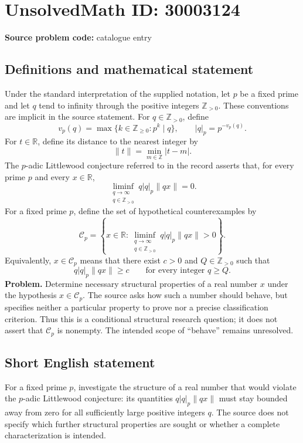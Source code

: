\documentclass[11pt]{article}
\newcommand{\Z}{\mathbb{Z}}
\newcommand{\R}{\mathbb{R}}
\begin{document}
\section*{UnsolvedMath ID: 30003124}
\textbf{Source problem code:} catalogue entry
\subsection{Definitions and mathematical statement}
Under the standard interpretation of the supplied notation, let \(p\) be a fixed prime and let \(q\) tend to infinity through the positive integers \(\Z_{>0}\). These conventions are implicit in the source statement. For \(q\in\Z_{>0}\), define
\[
v_p(q)=\max\{k\in\Z_{\geq 0}:p^k\mid q\},\qquad |q|_p=p^{-v_p(q)}.
\]
For \(t\in\R\), define its distance to the nearest integer by
\[
\|t\|=\min_{m\in\Z}|t-m|.
\]
The \(p\)-adic Littlewood conjecture referred to in the record asserts that, for every prime \(p\) and every \(x\in\R\),
\[
\liminf_{\substack{q\to\infty\\q\in\Z_{>0}}}q|q|_p\|qx\|=0.
\]
For a fixed prime \(p\), define the set of hypothetical counterexamples by
\[
\mathcal C_p=\left\{x\in\R:
\liminf_{\substack{q\to\infty\\q\in\Z_{>0}}}q|q|_p\|qx\|>0\right\}.
\]
Equivalently, \(x\in\mathcal C_p\) means that there exist \(c>0\) and \(Q\in\Z_{>0}\) such that
\[
q|q|_p\|qx\|\geq c\qquad\text{for every integer }q\geq Q.
\]
\textbf{Problem.} Determine necessary structural properties of a real number \(x\) under the hypothesis \(x\in\mathcal C_p\). The source asks how such a number should behave, but specifies neither a particular property to prove nor a precise classification criterion. Thus this is a conditional structural research question; it does not assert that \(\mathcal C_p\) is nonempty. The intended scope of ``behave'' remains unresolved.
\subsection{Short English statement}
For a fixed prime \(p\), investigate the structure of a real number that would violate the \(p\)-adic Littlewood conjecture: its quantities \(q|q|_p\|qx\|\) must stay bounded away from zero for all sufficiently large positive integers \(q\). The source does not specify which further structural properties are sought or whether a complete characterization is intended.
\end{document}

